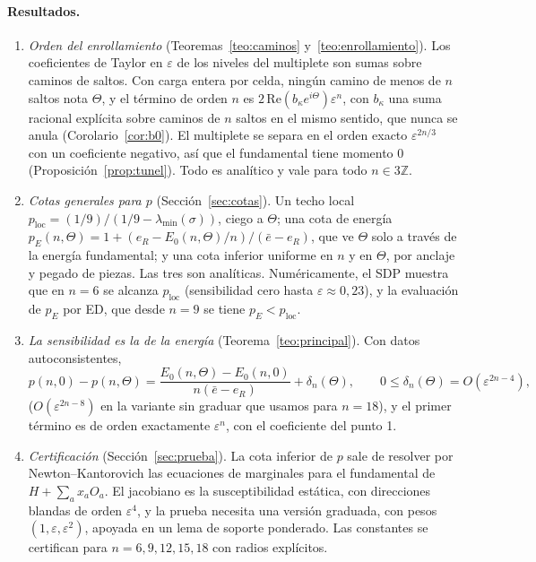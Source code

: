 \documentclass[11pt,a4paper]{article}
\theoremstyle{definition}
\theoremstyle{remark}
\newcommand{\eps}{\varepsilon}
\newcommand{\pE}{p_{E}}
\newcommand{\ploc}{p_{\mathrm{loc}}}
\begin{document}
\paragraph{Resultados.}
\begin{enumerate}
\item \emph{Orden del enrollamiento} (Teoremas~\ref{teo:caminos} y~\ref{teo:enrollamiento}). Los
  coeficientes de Taylor en $\eps$ de los niveles del multiplete son sumas sobre caminos de saltos.
  Con carga entera por celda, ningún camino de menos de $n$ saltos nota $\Theta$, y el término de orden
  $n$ es $2\,\mathrm{Re}(b_\kappa e^{i\Theta})\eps^n$, con $b_\kappa$ una suma racional explícita sobre caminos
  de $n$ saltos en el mismo sentido, que nunca se anula (Corolario~\ref{cor:b0}). El multiplete se
  separa en el orden exacto $\eps^{2n/3}$ con un coeficiente negativo, así que el fundamental tiene
  momento $0$ (Proposición~\ref{prop:tunel}). Todo es analítico y vale para todo $n\in3\mathbb Z$.
\item \emph{Cotas generales para $p$} (Sección~\ref{sec:cotas}). Un techo local
  $\ploc=(1/9)/(1/9-\lambda_{\min}(\sigma))$, ciego a $\Theta$; una cota de energía
  $\pE(n,\Theta)=1+(e_R-E_0(n,\Theta)/n)/(\bar e-e_R)$, que ve $\Theta$ solo a través de la energía
  fundamental; y una cota inferior uniforme en $n$ y en $\Theta$, por anclaje y pegado de piezas. Las
  tres son analíticas. Numéricamente, el SDP muestra que en $n=6$ se alcanza $\ploc$ (sensibilidad
  cero hasta $\eps\approx0{,}23$), y la evaluación de $\pE$ por ED, que desde $n=9$ se tiene $\pE<\ploc$.
\item \emph{La sensibilidad es la de la energía} (Teorema~\ref{teo:principal}). Con datos
  autoconsistentes,
  \[
    p(n,0)-p(n,\Theta)=\frac{E_0(n,\Theta)-E_0(n,0)}{n(\bar e-e_R)}+\delta_n(\Theta),\qquad
    0\le\delta_n(\Theta)=O(\eps^{2n-4}),
  \]
  ($O(\eps^{2n-8})$ en la variante sin graduar que usamos para $n=18$), y el primer término es de orden exactamente $\eps^n$, con el coeficiente del punto 1.
\item \emph{Certificación} (Sección~\ref{sec:prueba}). La cota inferior de $p$ sale de resolver
  por Newton--Kantorovich las ecuaciones de marginales para el fundamental de $H+\sum_ax_aO_a$. El
  jacobiano es la susceptibilidad estática, con direcciones blandas de orden $\eps^4$, y la prueba
  necesita una versión graduada, con pesos $(1,\eps,\eps^2)$, apoyada en un lema de soporte ponderado.
  Las constantes se certifican para $n=6,9,12,15,18$ con radios explícitos.
\end{enumerate}
\end{document}
